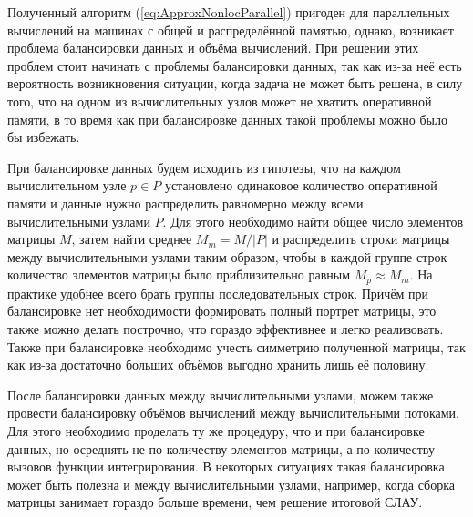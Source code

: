 Полученный алгоритм (\ref{eq:ApproxNonlocParallel}) пригоден для параллельных вычислений на машинах с общей и распределённой памятью, однако, возникает проблема балансировки данных и объёма вычислений. При решении этих проблем стоит начинать с проблемы балансировки данных, так как из-за неё есть вероятность возникновения ситуации, когда задача не может быть решена, в силу того, что на одном из вычислительных узлов может не хватить оперативной памяти, в то время как при балансировке данных такой проблемы можно было бы избежать.

При балансировке данных будем исходить из гипотезы, что на каждом вычислительном узле $p \in P$ установлено одинаковое количество оперативной памяти и данные нужно распределить равномерно между всеми вычислительными узлами $P$. Для этого необходимо найти общее число элементов матрицы $M$, затем найти среднее $M_m = M / |P|$ и распределить строки матрицы между вычислительными узлами таким образом, чтобы в каждой группе строк количество элементов матрицы было приблизительно равным $M_p \approx M_m$. На практике удобнее всего брать группы последовательных строк. Причём при балансировке нет необходимости формировать полный портрет матрицы, это также можно делать построчно, что гораздо эффективнее и легко реализовать. Также при балансировке необходимо учесть симметрию полученной матрицы, так как из-за достаточно больших объёмов выгодно хранить лишь её половину.

После балансировки данных между вычислительными узлами, можем также провести балансировку объёмов вычислений между вычислительными потоками. Для этого необходимо проделать ту же процедуру, что и при балансировке данных, но осреднять не по количеству элементов матрицы, а по количеству вызовов функции интегрирования. В некоторых ситуациях такая балансировка может быть полезна и между вычислительными узлами, например, когда сборка матрицы занимает гораздо больше времени, чем решение итоговой СЛАУ.

